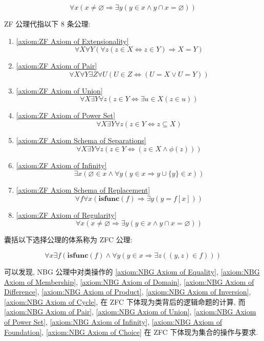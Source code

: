 \begin{axiom*}
    \label {axiom:ZF Axiom of Regularity}
    \[
        \forall x (x \neq \varnothing \Rightarrow \exists y (y \in x \land y \cap x = \varnothing))
    \]
\end{axiom*}

ZF 公理代指以下 8 条公理:

\begin{enumerate}
    \item \ref{axiom:ZF Axiom of Extensionality}
    \[
        \forall X \forall Y (\forall z (z \in X \Leftrightarrow z \in Y) \Rightarrow X = Y)
    \]
    \item \ref{axiom:ZF Axiom of Pair}
    \[
        \forall X \forall Y \exists Z \forall U (U \in Z \Leftrightarrow (U = X \lor U = Y))
    \]
    \item \ref{axiom:ZF Axiom of Union}
    \[
        \forall X \exists Y \forall z (z \in Y \Leftrightarrow \exists u \in X (z \in u))
    \]
    \item \ref{axiom:ZF Axiom of Power Set}
    \[
        \forall X \exists Y \forall z (z \in Y \Leftrightarrow z \subseteq X)
    \]
    \item \ref{axiom:ZF Axiom Schema of Separations}
    \[
        \forall X \exists Y \forall z (z \in Y \Leftrightarrow (z \in X \land \phi (z)))
    \]
    \item \ref{axiom:ZF Axiom of Infinity}
    \[
        \exists x (\varnothing \in x \land \forall y (y \in x \Rightarrow y \cup \{y\} \in x))
    \]
    \item \ref{axiom:ZF Axiom Schema of Replacement}
    \[
        \forall f \forall x (\mathbf{isfunc} (f) \Rightarrow \exists y (y = f[x]))
    \]
    \item \ref{axiom:ZF Axiom of Regularity}
    \[
        \forall x (x \neq \varnothing \Rightarrow \exists y (y \in x \land y \cap x = \varnothing))
    \]
\end{enumerate}

囊括以下选择公理的体系称为 ZFC 公理:

\begin{axiom*}
    \label {axiom:ZF Axiom of Choice}
    \[
        \forall x \exists f (\mathbf{isfunc} (f) \land \forall y (y \in x \Rightarrow \exists z ((y,z) \in f)))
    \]
\end{axiom*}

可以发现, NBG 公理中对类操作的 \ref{axiom:NBG Axiom of Equality}, \ref{axiom:NBG Axiom of Membership},
\ref{axiom:NBG Axiom of Domain}, \ref{axiom:NBG Axiom of Difference}, \ref{axiom:NBG Axiom of Product},
\ref{axiom:NBG Axiom of Inversion}, \ref{axiom:NBG Axiom of Cycle}, 在 ZFC 下体现为类背后的逻辑命题的计算,
而 \ref{axiom:NBG Axiom of Pair}, \ref{axiom:NBG Axiom of Union}, \ref{axiom:NBG Axiom of Power Set},
\ref{axiom:NBG Axiom of Infinity}, \ref{axiom:NBG Axiom of Foundation}, \ref{axiom:NBG Axiom of Choice}
在 ZFC 下体现为集合的操作与要求.


